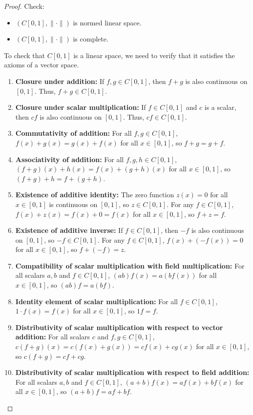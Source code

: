 \begin{proof}
Check:

\begin{itemize}
	\item $(C[0,1],\lVert \cdot \rVert)$ is normed linear space.
	\item $(C[0,1],\lVert \cdot  \rVert)$ is complete.
\end{itemize}

To check that $C[0,1]$ is a linear space, we need to verify that it satisfies the axioms of a vector space.

\begin{enumerate}
	\item \textbf{Closure under addition:} If $f, g \in C[0,1]$, then $f+g$ is also continuous on $[0,1]$. Thus, $f+g \in C[0,1]$.
	\item \textbf{Closure under scalar multiplication:} If $f \in C[0,1]$ and $c$ is a scalar, then $cf$ is also continuous on $[0,1]$. Thus, $cf \in C[0,1]$.
	\item \textbf{Commutativity of addition:} For all $f, g \in C[0,1]$, $f(x) + g(x) = g(x) + f(x)$ for all $x \in [0,1]$, so $f+g = g+f$.
	\item \textbf{Associativity of addition:} For all $f, g, h \in C[0,1]$, $(f+g)(x) + h(x) = f(x) + (g+h)(x)$ for all $x \in [0,1]$, so $(f+g)+h = f+(g+h)$.
	\item \textbf{Existence of additive identity:} The zero function $z(x) = 0$ for all $x \in [0,1]$ is continuous on $[0,1]$, so $z \in C[0,1]$. For any $f \in C[0,1]$, $f(x) + z(x) = f(x) + 0 = f(x)$ for all $x \in [0,1]$, so $f+z = f$.
	\item \textbf{Existence of additive inverse:} If $f \in C[0,1]$, then $-f$ is also continuous on $[0,1]$, so $-f \in C[0,1]$. For any $f \in C[0,1]$, $f(x) + (-f(x)) = 0$ for all $x \in [0,1]$, so $f + (-f) = z$.
	\item \textbf{Compatibility of scalar multiplication with field multiplication:} For all scalars $a, b$ and $f \in C[0,1]$, $(ab)f(x) = a(bf(x))$ for all $x \in [0,1]$, so $(ab)f = a(bf)$.
	\item \textbf{Identity element of scalar multiplication:} For all $f \in C[0,1]$, $1 \cdot f(x) = f(x)$ for all $x \in [0,1]$, so $1f = f$.
	\item \textbf{Distributivity of scalar multiplication with respect to vector addition:} For all scalars $c$ and $f, g \in C[0,1]$, $c(f+g)(x) = c(f(x) + g(x)) = cf(x) + cg(x)$ for all $x \in [0,1]$, so $c(f+g) = cf + cg$.
	\item \textbf{Distributivity of scalar multiplication with respect to field addition:} For all scalars $a, b$ and $f \in C[0,1]$, $(a+b)f(x) = af(x) + bf(x)$ for all $x \in [0,1]$, so $(a+b)f = af + bf$.
\end{enumerate}


\end{proof}
